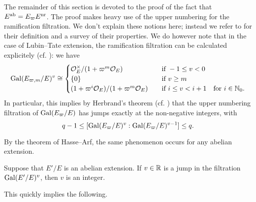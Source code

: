\documentclass[../main.tex]{subfiles}
\begin{document}
The remainder of this section is devoted to the proof of the fact that $E^{\mathrm{ab}} =
E_\varpi E^{\mathrm{nr}}$. 
The proof makes heavy use of the upper numbering for the ramification filtration.
We don't explain these notions here; instead we refer to \cite[Chapter
IV]{serre2013local} for their definition and a survey of their properties. We
do however note that in the case of Lubin--Tate extension, the ramification
filtration can be calculated explicitely (cf. \cite[Theorem 2]{gold1981local}): we have
\begin{equation}\label{eq:CalculationOfUpperRamificationFiltration}
  \operatorname{Gal}(E_{\varpi, m}/E)^v \cong \begin{cases}
    \mathcal{O}_E^\times/(1 + \varpi^m \mathcal{O}_E) \quad &\text{if } -1 \leq v < 0 \\
    \{0\} \quad &\text{if } v \geq m \\
    (1 + \varpi^i \mathcal{O}_E)/(1+\varpi^m \mathcal{O}_E) \quad &\text{if } i \leq v < i+1
    \quad \text{for } i \in \mathbb{N}_0.
  \end{cases}
\end{equation}
In particular, this implies by Herbrand's theorem (cf. \cite[Ch. 4, Proposition
14]{serre2013local}) that the upper numbering filtration of 
$\operatorname{Gal}(E_\varpi/E)$ has jumps exactly at the non-negative integers, with
\begin{equation*}
  q-1 \leq [\operatorname{Gal}(E_\varpi/E)^{v}: \operatorname{Gal}(E_\varpi/E)^{v-1}] \leq q.
\end{equation*}

By the theorem of Hasse--Arf, the same phenomenon occurs for any abelian extension.
\begin{thm}\label{thm:Hasse--Arf}
  Suppose that $E'/E$ is an abelian extension. If $v \in \mathbb{R}$ is a jump in the 
  filtration $\operatorname{Gal}(E'/E)^v$, then $v$ is an integer.
\end{thm}

This quickly implies the following.
\end{document}
